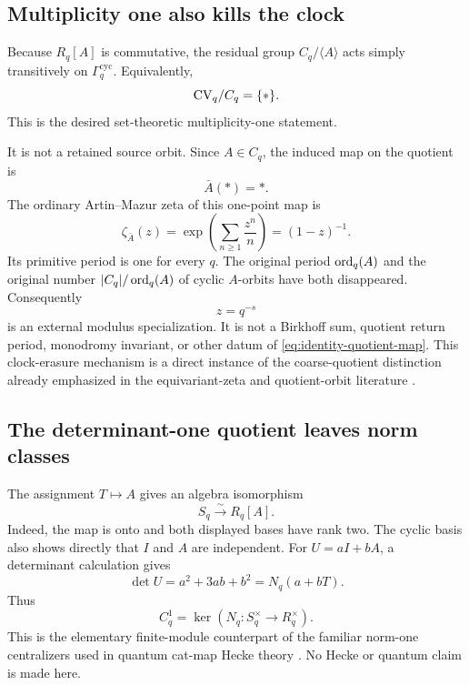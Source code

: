 \documentclass[11pt]{article}
\theoremstyle{definition}
\theoremstyle{remark}
\begin{document}
\subsection{Multiplicity one also kills the clock}

Because \(R_q[A]\) is commutative, the residual group
\(C_q/\langle A\rangle\) acts simply transitively on
\(\Gamma_q^{\mathrm{cyc}}\).  Equivalently,
\begin{equation}
  \mathrm{CV}_q/C_q=\{*\}.
  \label{eq:one-point-quotient}
\end{equation}
This is the desired set-theoretic multiplicity-one statement.

It is not a retained source orbit.  Since \(A\in C_q\), the induced map on
the quotient is
\begin{equation}
  \bar A(*)=*.
  \label{eq:identity-quotient-map}
\end{equation}
The ordinary Artin--Mazur zeta of this one-point map is
\begin{equation}
  \zeta_{\bar A}(z)
  =\exp\!\left(\sum_{n\ge1}\frac{z^n}{n}\right)
  =(1-z)^{-1}.
  \label{eq:one-point-zeta}
\end{equation}
Its primitive period is one for every \(q\).  The original period
\(\operatorname{ord}_q(A)\) and the original number
\(|C_q|/\operatorname{ord}_q(A)\) of cyclic \(A\)-orbits have both disappeared.
Consequently
\begin{equation}
  z=q^{-s}
  \label{eq:external-specialization}
\end{equation}
is an external modulus specialization.  It is not a Birkhoff sum, quotient
return period, monodromy invariant, or other datum of
\eqref{eq:identity-quotient-map}.  This clock-erasure mechanism is a direct
instance of the coarse-quotient distinction already emphasized in the
equivariant-zeta and quotient-orbit literature
\citep{GuseinZadeLuengoMelle2015,Zegowitz2017}.

\subsection{The determinant-one quotient leaves norm classes}

The assignment \(T\mapsto A\) gives an algebra isomorphism
\begin{equation}
  S_q\xrightarrow{\sim}R_q[A].
  \label{eq:algebra-isomorphism}
\end{equation}
Indeed, the map is onto and both displayed bases have rank two.  The cyclic
basis also shows directly that \(I\) and \(A\) are independent.  For
\(U=aI+bA\), a determinant calculation gives
\begin{equation}
  \det U=a^2+3ab+b^2=N_q(a+bT).
  \label{eq:determinant-norm}
\end{equation}
Thus
\begin{equation}
  C_q^1=\ker\!\left(N_q:S_q^\times\to R_q^\times\right).
  \label{eq:norm-one-centralizer}
\end{equation}
This is the elementary finite-module counterpart of the familiar norm-one
centralizers used in quantum cat-map Hecke theory
\citep{KurlbergRudnick2000}.  No Hecke or quantum claim is made here.
\end{document}
